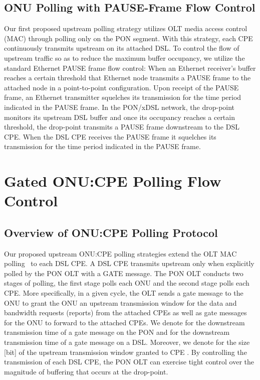 \documentclass[pdftex,journal]{IEEEtran}
\begin{document}
\subsection{ONU Polling with PAUSE-Frame Flow Control}
\label{sec:onupoll}
Our first proposed upstream polling strategy utilizes OLT media access
control (MAC) through polling only on the PON segment. With this strategy,
each CPE continuously
transmits upstream on its attached DSL. To control the flow of
upstream traffic so as to reduce the maximum buffer occupancy,
we utilize the standard Ethernet PAUSE frame flow control:
When an Ethernet receiver's buffer reaches a certain threshold that
Ethernet node transmits a PAUSE frame to the attached node in a
point-to-point configuration. Upon receipt of the PAUSE frame, an
Ethernet transmitter squelches its transmission for the time period
indicated in the PAUSE frame.
In the PON/xDSL network, the drop-point monitors its upstream
DSL buffer and once its occupancy reaches a certain threshold,
the drop-point transmits
a PAUSE frame downstream to the DSL CPE. When the DSL CPE
receives the PAUSE frame it squelches its transmission for the time
period indicated in the PAUSE frame.

\section{Gated ONU:CPE Polling Flow Control}  \label{onucpe_poll:sec}
\subsection{Overview of ONU:CPE Polling Protocol}
Our proposed upstream ONU:CPE polling strategies extend the
OLT MAC polling~\cite{hos2015mul,kan2012ban,KMP0202,mer2011ban,ZM0709}
to each DSL CPE.
A DSL CPE transmits upstream only when explicitly
polled by the PON OLT with a GATE message.
The PON OLT conducts two stages of polling,
the first stage polls each ONU and the second stage polls each CPE.
More specifically, in a given cycle, the OLT sends a gate
message to the ONU to grant the ONU an upstream transmission window for
the data and bandwidth requests (reports) from the attached CPEs as well as
 gate messages for the ONU to forward to the attached  CPEs.
We denote  for the downstream transmission time of a gate message on
the PON and  for the downstream transmission time of a gate message
on a DSL. Moreover, we denote  for the size [bit] of the upstream
transmission window granted to CPE .
By controlling the transmission of each DSL CPE, the PON OLT can exercise
tight control over the magnitude of buffering that occurs at the drop-point.
\end{document}
